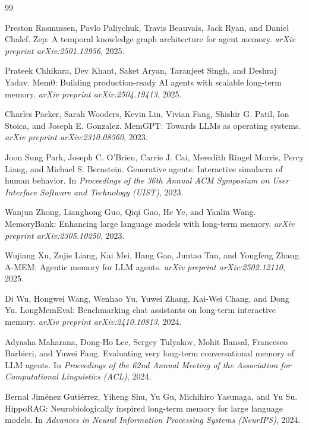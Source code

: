 \documentclass[11pt,a4paper]{article}
\begin{document}
\clearpage
\begin{thebibliography}{99}\small

Preston Rasmussen, Pavlo Paliychuk, Travis Beauvais, Jack Ryan, and Daniel Chalef.
Zep: A temporal knowledge graph architecture for agent memory.
\textit{arXiv preprint arXiv:2501.13956}, 2025.

Prateek Chhikara, Dev Khant, Saket Aryan, Taranjeet Singh, and Deshraj Yadav.
Mem0: Building production-ready AI agents with scalable long-term memory.
\textit{arXiv preprint arXiv:2504.19413}, 2025.

Charles Packer, Sarah Wooders, Kevin Lin, Vivian Fang, Shishir G. Patil, Ion Stoica, and Joseph E. Gonzalez.
MemGPT: Towards LLMs as operating systems.
\textit{arXiv preprint arXiv:2310.08560}, 2023.

Joon Sung Park, Joseph C. O'Brien, Carrie J. Cai, Meredith Ringel Morris, Percy Liang, and Michael S. Bernstein.
Generative agents: Interactive simulacra of human behavior.
In \textit{Proceedings of the 36th Annual ACM Symposium on User Interface Software and Technology (UIST)}, 2023.

Wanjun Zhong, Lianghong Guo, Qiqi Gao, He Ye, and Yanlin Wang.
MemoryBank: Enhancing large language models with long-term memory.
\textit{arXiv preprint arXiv:2305.10250}, 2023.

Wujiang Xu, Zujie Liang, Kai Mei, Hang Gao, Juntao Tan, and Yongfeng Zhang.
A-MEM: Agentic memory for LLM agents.
\textit{arXiv preprint arXiv:2502.12110}, 2025.

Di Wu, Hongwei Wang, Wenhao Yu, Yuwei Zhang, Kai-Wei Chang, and Dong Yu.
LongMemEval: Benchmarking chat assistants on long-term interactive memory.
\textit{arXiv preprint arXiv:2410.10813}, 2024.

Adyasha Maharana, Dong-Ho Lee, Sergey Tulyakov, Mohit Bansal, Francesco Barbieri, and Yuwei Fang.
Evaluating very long-term conversational memory of LLM agents.
In \textit{Proceedings of the 62nd Annual Meeting of the Association for Computational Linguistics (ACL)}, 2024.

Bernal Jim\'enez Guti\'errez, Yiheng Shu, Yu Gu, Michihiro Yasunaga, and Yu Su.
HippoRAG: Neurobiologically inspired long-term memory for large language models.
In \textit{Advances in Neural Information Processing Systems (NeurIPS)}, 2024.


\end{thebibliography}
\end{document}
